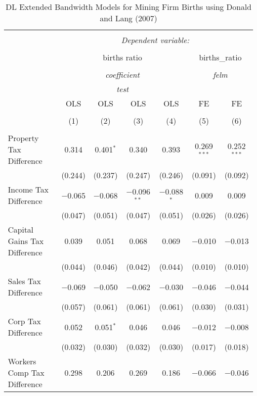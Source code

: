 
\begin{table}[!htbp] \centering 
  \caption{DL Extended Bandwidth Models for  Mining Firm Births using Donald and Lang (2007)} 
  \label{} 
\begin{tabular}{@{\extracolsep{5pt}}lcccccc} 
\\[-1.8ex]\hline 
\hline \\[-1.8ex] 
 & \multicolumn{6}{c}{\textit{Dependent variable:}} \\ 
\cline{2-7} 
\\[-1.8ex] & \multicolumn{4}{c}{births ratio} & \multicolumn{2}{c}{births\_ratio} \\ 
\\[-1.8ex] & \multicolumn{4}{c}{\textit{coefficient}} & \multicolumn{2}{c}{\textit{felm}} \\ 
 & \multicolumn{4}{c}{\textit{test}} & \multicolumn{2}{c}{\textit{}} \\ 
 & OLS & OLS & OLS & OLS & FE & FE \\ 
\\[-1.8ex] & (1) & (2) & (3) & (4) & (5) & (6)\\ 
\hline \\[-1.8ex] 
 Property Tax Difference & 0.314 & 0.401$^{*}$ & 0.340 & 0.393 & 0.269$^{***}$ & 0.252$^{***}$ \\ 
  & (0.244) & (0.237) & (0.247) & (0.246) & (0.091) & (0.092) \\ 
  Income Tax Difference & $-$0.065 & $-$0.068 & $-$0.096$^{**}$ & $-$0.088$^{*}$ & 0.009 & 0.009 \\ 
  & (0.047) & (0.051) & (0.047) & (0.051) & (0.026) & (0.026) \\ 
  Capital Gains Tax Difference & 0.039 & 0.051 & 0.068 & 0.069 & $-$0.010 & $-$0.013 \\ 
  & (0.044) & (0.046) & (0.042) & (0.044) & (0.010) & (0.010) \\ 
  Sales Tax Difference & $-$0.069 & $-$0.050 & $-$0.062 & $-$0.030 & $-$0.046 & $-$0.044 \\ 
  & (0.057) & (0.061) & (0.061) & (0.061) & (0.030) & (0.031) \\ 
  Corp Tax Difference & 0.052 & 0.051$^{*}$ & 0.046 & 0.046 & $-$0.012 & $-$0.008 \\ 
  & (0.032) & (0.030) & (0.032) & (0.030) & (0.017) & (0.018) \\ 
  Workers Comp Tax Difference & 0.298 & 0.206 & 0.269 & 0.186 & $-$0.066 & $-$0.046 \\ 

\end{tabular}
\end{table}
